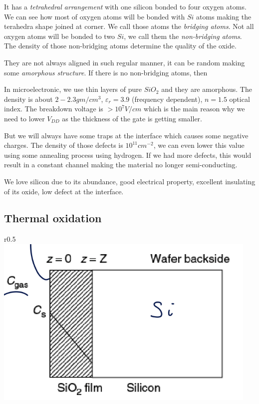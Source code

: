 \documentclass[
]{article}
\begin{document}
It has a \emph{tetrahedral arrangement} with one silicon bonded to four
oxygen atoms. We can see how most of oxygen atoms will be bonded with
\(Si\) atoms making the terahedra shape joined at corner. We call those
atoms the \emph{bridging atoms}. Not all oxygen atoms will be bonded to
two \(Si\), we call them the \emph{non-bridging atoms}. The density of
those non-bridging atoms determine the quality of the oxide.

They are not always aligned in such regular manner, it can be random
making some \emph{amorphous structure}. If there is no non-bridging
atoms, then

In microelectronic, we use thin layers of pure \(SiO_2\) and they are
amorphous. The density is about \(2-2.3 gm/cm^3\),
\(\varepsilon_r = 3.9\) (frequency dependent), \(n=1.5\) optical index.
The breakdown voltage is \(> 10^7 V/cm\) which is the main reason why we
need to lower \(V_{DD}\) as the thickness of the gate is getting
smaller.

But we will always have some traps at the interface which causes some
negative charges. The density of those defects is \(10^{11}cm^{-2}\), we
can even lower this value using some annealing process using hydrogen.
If we had more defects, this would result in a constant channel making
the material no longer semi-conducting.

We love silicon due to its abundance, good electrical property,
excellent insulating of its oxide, low defect at the interface.

\hypertarget{thermal-oxidation}{%
\subsection{Thermal oxidation}\label{thermal-oxidation}}

r0.5
\includegraphics[width=0.95\textwidth,height=\textheight]{growth_of_oxide.png}
\end{document}
